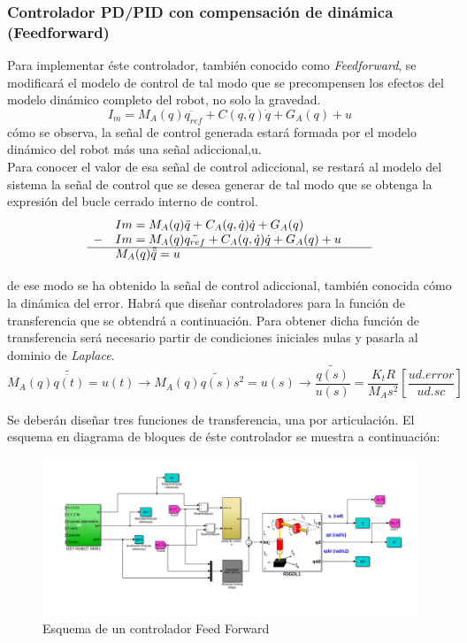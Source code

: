	\subsubsection{Controlador PD/PID con compensación de dinámica (Feedforward)}
	Para implementar éste controlador, también conocido como \textit{Feedforward}, se modificará el modelo de control de tal modo que se precompensen los efectos del modelo dinámico completo del robot, no solo la gravedad.
	\begin{equation}
		I_m= M_{A}(q)\ddot{q_{ref}} + C(q,\dot{q})\dot{q} + G_{A}(q) + u
	\end{equation}
cómo se observa, la señal de control generada estará formada por el modelo dinámico del robot más una señal adiccional,u.\\
Para conocer el valor de esa señal de control adiccional, se restará al modelo del sistema la señal de control que se desea generar de tal modo que se obtenga la expresión del bucle cerrado interno de control.
\begin{equation}
	\begin{array}{llll}
	  & Im=M_{A}(q)\ddot{q} + C_{A}(q,\dot{q})\dot{q} + G_{A}(q) \\
	- & Im=M_{A}(q)\ddot{q_{ref}} + C_{A}(q,\dot{q})\dot{q} + G_{A}(q) + u \\
	\cline{1-4}
	\vspace{0.2cm}
	  & M_{A}(q)\tilde{\ddot{q}} = u & &
	\end{array}
\end{equation}
de ese modo se ha obtenido la señal de control adiccional, también conocida cómo la dinámica del error. Habrá que diseñar controladores para la función de transferencia que se obtendrá a continuación. Para obtener dicha función de transferencia será necesario partir de condiciones iniciales nulas y pasarla al dominio de \textit{Laplace}.
\begin{equation}
	M_{A}(q)\tilde{\ddot{q(t)}} = u(t) \rightarrow M_{A}(q)\tilde{q(s)}s^{2} = u(s) \rightarrow \frac{\tilde{q(s)}}{u(s)}=\frac{K_{t}R}{M_{A}s^{2}}[\frac{ud.error}{ud.sc}]
\end{equation}

Se deberán diseñar tres funciones de transferencia, una por articulación. El esquema en diagrama de bloques de éste controlador se muestra a continuación:

\begin{figure}[h!]
	\centering
	\includegraphics[width=.8\textwidth]{montaje_feedforward}
	\caption{Esquema de un controlador Feed Forward}
\end{figure}

